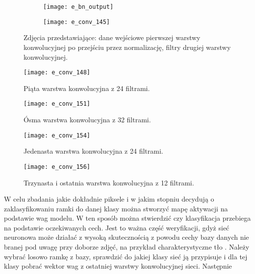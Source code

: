 \begin{figure}[h!]
    \centering
    \begin{subfigure}[b]{0.65\textwidth}
        \texttt{[image: e\_bn\_output]}\caption{}
        \label{fig:e_bn_output}
    \end{subfigure}
    \begin{subfigure}[b]{0.65\textwidth}
        \texttt{[image: e\_conv\_145]}\caption{}
        \label{fig:e_conv_145}
    \end{subfigure}
    \caption{Zdjęcia przedstawiające: \protect{} dane wejściowe pierwszej warstwy konwolucyjnej po przejściu przez normalizację, \protect{} filtry drugiej warstwy konwolucyjnej.}
	\label{fig:filters_1}
\end{figure}

\begin{figure}[h!]
	\centering
	\centering
		\texttt{[image: e\_conv\_148]}	
	\caption{Piąta warstwa konwolucyjna z 24 filtrami.}\label{fig:e_conv_148}
\end{figure}

\begin{figure}[h!]
	\centering
	\centering
		\texttt{[image: e\_conv\_151]}	
	\caption{Ósma warstwa konwolucyjna z 32 filtrami.}\label{fig:e_conv_151}
\end{figure}

\begin{figure}[h!]
	\centering
	\centering
		\texttt{[image: e\_conv\_154]}	
	\caption{Jedenasta warstwa konwolucyjna z 24 filtrami.}\label{fig:e_conv_154}
\end{figure}

\begin{figure}[h!]
	\centering
	\centering
		\texttt{[image: e\_conv\_156]}	
	\caption{Trzynasta i ostatnia warstwa konwolucyjna z 12 filtrami.}\label{fig:e_conv_156}
\end{figure}

\clearpage  
W celu zbadania jakie dokładnie piksele i w jakim stopniu decydują o zaklasyfikowaniu ramki do danej klasy można stworzyć mapę aktywacji na podstawie wag modelu. W ten sposób można stwierdzić czy klasyfikacja przebiega na podstawie oczekiwanych cech. Jest to ważna część weryfikacji, gdyż sieć neuronowa może działać z wysoką skutecznością z powodu cechy bazy danych nie branej pod uwagę przy doborze zdjęć, na przykład charakterystyczne tło \cite{Mller2012IntroductionPA}. Należy wybrać losowo ramkę z bazy, sprawdzić do jakiej klasy sieć ją przypisuje i dla tej klasy pobrać wektor wag z ostatniej warstwy konwolucyjnej sieci. Następnie 
